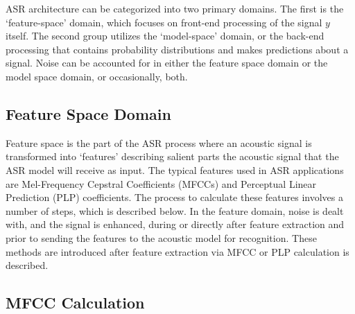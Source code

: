 ASR architecture can be categorized into two primary domains. The first is the `feature-space' domain, which focuses on front-end processing of the signal $y$ itself.  The second group utilizes the `model-space' domain, or the back-end processing that contains probability distributions and makes predictions about a signal. %
Noise can be accounted for in either the feature space domain or the model space domain, or occasionally, both.  %

\subsection{Feature Space Domain}

Feature space is the part of the ASR process where an acoustic signal is transformed into `features' describing salient parts the acoustic signal that the ASR model will receive as input. The typical features used in ASR applications are Mel-Frequency Cepstral Coefficients (MFCCs) and Perceptual Linear Prediction (PLP) coefficients. The process to calculate these features involves a number of steps, which is described below.  In the feature domain, noise is dealt with, and the signal is enhanced, during or directly after feature extraction and prior to sending the features to the acoustic model for recognition.  These methods are introduced after feature extraction via MFCC or PLP calculation is described.

\subsection{MFCC Calculation}\label{sec:mfcc-calc}

